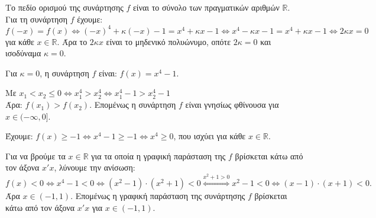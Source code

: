 \begin{alist}
\item Το πεδίο ορισμού της συνάρτησης $f$ είναι το σύνολο των πραγματικών αριθμών $\mathbb{R}$. \\
Για τη συνάρτηση $f$ έχουμε:
\[f(-x) = f(x) \Leftrightarrow (-x)^4 + \kappa(-x) - 1 = x^4 + \kappa x - 1 \Leftrightarrow x^4 - \kappa x - 1 = x^4 + \kappa x - 1 \Leftrightarrow 2\kappa x = 0\]
για κάθε $x \in \mathbb{R}$. Άρα το $2\kappa x$ είναι το μηδενικό πολυώνυμο, οπότε $2\kappa = 0$ και ισοδύναμα $\kappa = 0$.
\item Για $\kappa = 0$, η συνάρτηση $f$ είναι: $f(x) = x^4 - 1$.
\begin{rlist}
\item Με $x_1 < x_2 \le 0 \Leftrightarrow x_1^4 > x_2^4 \Leftrightarrow x_1^4 - 1 > x_2^4 - 1$ \\
Άρα: $f(x_1) > f(x_2)$. Επομένως η συνάρτηση $f$ είναι γνησίως φθίνουσα για $x \in (-\infty, 0]$.
\item Έχουμε: $f(x) \ge -1 \Leftrightarrow x^4 - 1 \ge -1 \Leftrightarrow x^4 \ge 0$, που ισχύει για κάθε $x \in \mathbb{R}$.
\item Για να βρούμε τα $x \in \mathbb{R}$ για τα οποία η γραφική παράσταση της $f$ βρίσκεται κάτω από τον άξονα $x'x$, λύνουμε την ανίσωση:
\[f(x) < 0 \Leftrightarrow x^4 - 1 < 0 \Leftrightarrow (x^2 - 1) \cdot (x^2 + 1) < 0 \overset{x^2+1 > 0}{\Leftrightarrow} x^2 - 1 < 0 \Leftrightarrow (x - 1) \cdot (x + 1) < 0.\]
Άρα $x \in (-1, 1)$. Επομένως η γραφική παράσταση της συνάρτησης $f$ βρίσκεται κάτω από τον άξονα $x'x$ για $x \in (-1, 1)$.
\end{rlist}
\end{alist}

